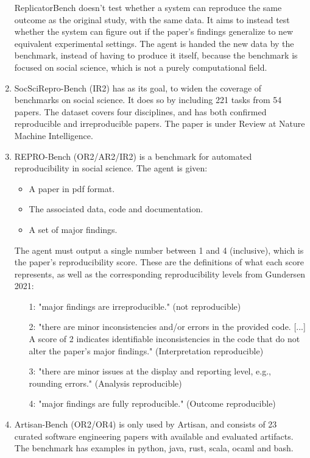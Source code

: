 \documentclass[8pt,a4paper]{article}
\begin{document}
\begin{enumerate}
        ReplicatorBench doesn't test whether a system can reproduce the same outcome as the original study, with the same data.
        It aims to instead test whether the system can figure out 
        if the paper's findings generalize to new equivalent experimental settings.
        The agent is handed the new data by the benchmark, instead of having to produce it itself, 
        because the benchmark is focused on social science, 
        which is not a purely computational field.
    \item SocSciRepro-Bench\cite{socscireprobench} (IR2)
        \subitem has as its goal, to widen the coverage of benchmarks on social science.
        It does so by including 221 tasks from 54 papers.
        The dataset covers four disciplines, 
        and has both confirmed reproducible and irreproducible papers.
        The paper is under Review at Nature Machine Intelligence.
    \item REPRO-Bench\cite{reprobench}\label{itm:reprobenchatbenchmarks} (OR2/AR2/IR2)
        \subitem is a benchmark for automated reproducibility in social science.
        The agent is given:
        \begin{itemize}
            \item A paper in pdf format.
            \item The associated data, code and documentation.
            \item A set of major findings.
        \end{itemize}
        The agent must output a single number between 1 and 4 (inclusive),
        which is the paper's reproducibility score.
        These are the definitions of what each score represents, 
        as well as the corresponding reproducibility levels from Gundersen 2021\cite{gundersen2021}:
        \begin{enumerate}
            \item[1:] "major findings are irreproducible." (not reproducible)
            \item[2:] "there are minor inconsistencies and/or errors in the provided code. [...] 
            A score of 2 indicates identifiable inconsistencies in the code that do not alter the paper’s major findings." (Interpretation reproducible)
            \item[3:] "there are minor issues at the display and reporting level, e.g., rounding errors." (Analysis reproducible)
            \item[4:] "major findings are fully reproducible." (Outcome reproducible)
        \end{enumerate}
    \item Artisan-Bench\cite[pages~9--17]{artisan} (OR2/OR4)
        \subitem is only used by Artisan\cite{artisan}, and consists of 23 curated software engineering papers with available and evaluated artifacts. 
        The benchmark has examples in python, java, rust, scala, ocaml and bash.
\end{enumerate}
\end{document}
